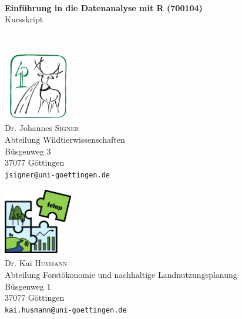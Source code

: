 \begin{titlepage}
\begin{center}


\HRule \\[0.4cm]
{ \huge \bfseries Einführung in die Datenanalyse mit R (700104)}\\[0.4cm]
{\Large Kursskript}

\HRule \\[1.5cm]

\begin{minipage}{0.35\textwidth}
\begin{flushleft}
\includegraphics[width=3cm,height=3cm]{misc/fig/logo_wildtierw1.png}
~\\[0.4cm]
Dr. Johannes \textsc{Signer} \\
Abteilung Wildtierwissenschaften \\
Büsgenweg 3 \\
37077 Göttingen \\[0.5cm]
\vfill
\texttt{jsigner@uni-goettingen.de}
\end{flushleft}
\end{minipage}
\hfill
\begin{minipage}{0.60\textwidth}
\begin{flushright}
\includegraphics[width=3cm,height=3cm]{misc/fig/logo_felap.png}
~\\[0.4cm]
Dr. Kai \textsc{Husmann} \\
Abteilung Forstökonomie und nachhaltige Landnutzungsplanung \\
Büsgenweg 1 \\
37077 Göttingen \\[0.5cm]
\vfill
\texttt{kai.husmann@uni-goettingen.de}
\end{flushright}
\end{minipage}



\end{center}
\end{titlepage}
